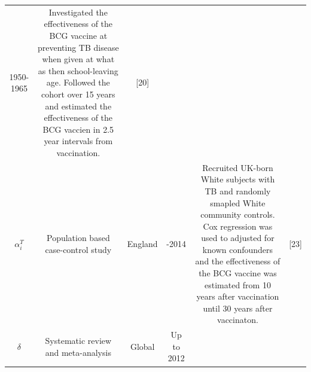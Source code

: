\documentclass[11pt,twoside]{bristolthesis}
\begin{document}
\begin{longtable}[]{@{}cccccc@{}}
\begin{minipage}[t]{0.08\columnwidth}
  1950-1965\strut
  \end{minipage} & \begin{minipage}[t]{0.29\columnwidth}\centering
  Investigated the effectiveness of the
  BCG vaccine at preventing TB disease
  when given at what as then
  school-leaving age. Followed the cohort
  over 15 years and estimated the
  effectiveness of the BCG vaccien in 2.5
  year intervals from vaccination.\strut
  \end{minipage} & \begin{minipage}[t]{0.12\columnwidth}\centering
  {[}20{]}\strut
  \end{minipage}\tabularnewline
  \begin{minipage}[t]{0.16\columnwidth}\centering
  \(\alpha_i^T\)\strut
  \end{minipage} & \begin{minipage}[t]{0.11\columnwidth}\centering
  Population
  based
  case-control
  study\strut
  \end{minipage} & \begin{minipage}[t]{0.08\columnwidth}\centering
  England\strut
  \end{minipage} & \begin{minipage}[t]{0.08\columnwidth}\centering
  2002-2014\strut
  \end{minipage} & \begin{minipage}[t]{0.29\columnwidth}\centering
  Recruited UK-born White subjects with TB
  and randomly smapled White community
  controls. Cox regression was used to
  adjusted for known confounders and the
  effectiveness of the BCG vaccine was
  estimated from 10 years after
  vaccination until 30 years after
  vaccinaton.\strut
  \end{minipage} & \begin{minipage}[t]{0.12\columnwidth}\centering
  {[}23{]}\strut
  \end{minipage}\tabularnewline
  \begin{minipage}[t]{0.16\columnwidth}\centering
  \(\delta\)\strut
  \end{minipage} & \begin{minipage}[t]{0.11\columnwidth}\centering
  Systematic
  review and
  meta-analysis\strut
  \end{minipage} & \begin{minipage}[t]{0.08\columnwidth}\centering
  Global\strut
  \end{minipage} & \begin{minipage}[t]{0.08\columnwidth}\centering
  Up to
  2012\strut

\end{minipage}
\end{longtable}
\end{document}
